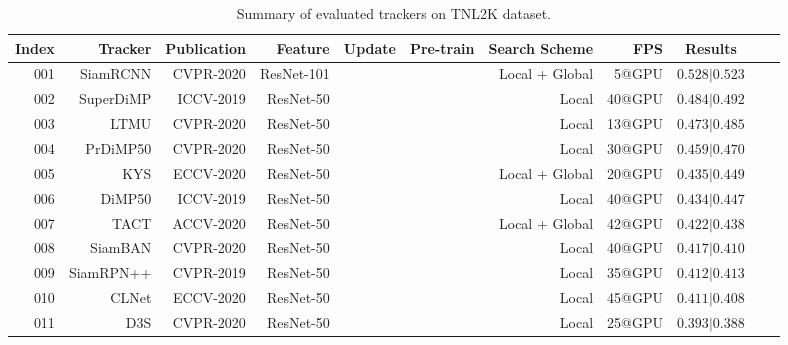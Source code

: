 \documentclass[final]{cvpr}
\begin{document}
\begin{table*}[!htp]
\center
\scriptsize  
\caption{Summary of evaluated trackers on TNL2K dataset.}  
\label{SummaryTrackers}  
\begin{tabular}{rrrrccrrccc} 		\hline \toprule [0.8 pt] 
\textbf{Index} 		&\textbf{Tracker}  	&\textbf{Publication}  &\textbf{Feature}      		&\textbf{Update}			&\textbf{Pre-train}				&\textbf{Search Scheme} 		&\textbf{FPS} 		 &\textbf{Results}    \\
\hline 
001			&SiamRCNN	 \cite{voigtlaender2020siamRCNN}		&CVPR-2020    	&ResNet-101     	&\xmark    		 	&\cmark    	&Local + Global	&5@GPU    		&$0.528|0.523$\\
002			&SuperDiMP    \cite{bhat2019DiMP}							&ICCV-2019    	&ResNet-50     	&\cmark     			&\cmark    	&Local    		 		&40@GPU    	&$0.484|0.492$		 	\\
003			&LTMU 			 \cite{dai2020ltmu}								&CVPR-2020    	&ResNet-50     	&\cmark     			&\cmark    	&Local    		 		&13@GPU    	&$0.473|0.485$		 	\\
004			&PrDiMP50 	 \cite{danelljan2020PRDiMP}				&CVPR-2020    	&ResNet-50     	&\cmark     			&\cmark    	&Local    		 		&30@GPU    	&$0.459|0.470$		 	\\
005			&KYS			 	 \cite{Goutam2020KYS}						&ECCV-2020    	&ResNet-50     	&\cmark     			&\cmark    	&Local + Global  &20@GPU    	&$0.435|0.449$		 	\\
006			&DiMP50	 		 \cite{bhat2019DiMP}							&ICCV-2019    	&ResNet-50     	&\cmark     			&\cmark    	&Local    		 		&40@GPU    	&$0.434|0.447$		 	\\
007			&TACT		 	 \cite{choi2020TACT}							&ACCV-2020    	&ResNet-50     	&\xmark    			&\cmark    	&Local + Global  &42@GPU    	&$0.422|0.438$		 	\\
008			&SiamBAN		 \cite{chen2020siamban}						&CVPR-2020    	&ResNet-50     	&\xmark     			&\cmark    	&Local    		 		&40@GPU    	&$0.417|0.410$		 	\\
009			&SiamRPN++	 \cite{li2018siamrpn++}						&CVPR-2019    	&ResNet-50     	&\xmark     			&\cmark    	&Local    		 		&35@GPU    	&$0.412|0.413$		 	\\
010			&CLNet		 	 \cite{dong2020clnet}							&ECCV-2020    	&ResNet-50     	&\xmark     			&\cmark    	&Local    		 		&45@GPU    	&$0.411|0.408$		 	\\
011			&D3S			 	 \cite{lukezic2020d3s}							&CVPR-2020    	&ResNet-50     	&\xmark     			&\cmark    	&Local    		 		&25@GPU    	&$0.393|0.388$		 	\\

\end{tabular}
\end{table*}
\end{document}
